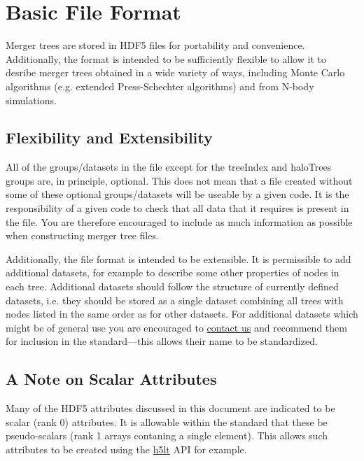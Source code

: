 \section{Basic File Format}\label{sec:MergerTreeFormatDescription}

Merger trees are stored in HDF5 files for portability and convenience. Additionally, the format is intended to be sufficiently flexible to allow it to desribe merger trees obtained in a wide variety of ways, including Monte Carlo algorithms (e.g. extended Press-Schechter algorithms) and from N-body simulations. 

\subsection{Flexibility and Extensibility}

All of the groups/datasets in the file except for the {\normalfont \ttfamily treeIndex} and {\normalfont \ttfamily haloTrees} groups are, in principle, optional. This does not mean that a file created without some of these optional groups/datasets will be useable by a given code. It is the responsibility of a given code to check that all data that it requires is present in the file. You are therefore encouraged to include as much information as possible when constructing merger tree files.

Additionally, the file format is intended to be extensible. It is permissible to add additional datasets, for example to describe some other properties of nodes in each tree. Additional datasets should follow the structure of currently defined datasets, i.e. they should be stored as a single dataset combining all trees with nodes listed in the same order as for other datasets. For additional datasets which might be of general use you are encouraged to \href{mailto:abenson@obs.carnegiescience.edu}{contact us} and recommend them for inclusion in the standard---this allows their name to be standardized.

\subsection{A Note on Scalar Attributes}

Many of the HDF5 attributes discussed in this document are indicated to be scalar (rank 0) attributes. It is allowable within the standard that these be pseudo-scalars (rank 1 arrays contaning a single element). This allows such attributes to be created using the \href{http://www.hdfgroup.org/HDF5/doc/HL/RM_H5LT.html}{\normalfont \ttfamily h5lt} API for example.

